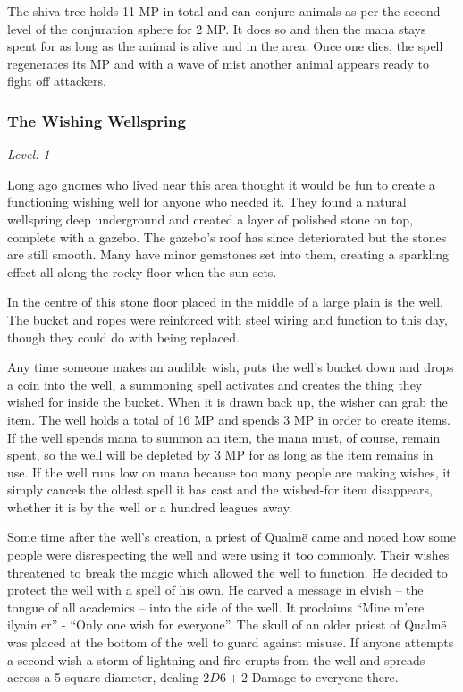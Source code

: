 \begin{multicols}{2}
The shiva tree holds 11 MP in total and can conjure animals as per the second level of the conjuration sphere for 2 MP.  It does so and then the mana stays spent for as long as the animal is alive and in the area.  Once one dies, the spell regenerates its MP and with a wave of mist another animal appears ready to fight off attackers.

\subsubsection{The Wishing Wellspring}

\textit{Level: 1}

Long ago gnomes who lived near this area thought it would be fun to create a functioning wishing well for anyone who needed it.  They found a natural wellspring deep underground and created a layer of polished stone on top, complete with a gazebo.  The gazebo's roof has since deteriorated but the stones are still smooth.  Many have minor gemstones set into them, creating a sparkling effect all along the rocky floor when the sun sets.

In the centre of this stone floor placed in the middle of a large plain is the well.  The bucket and ropes were reinforced with steel wiring and function to this day, though they could do with being replaced.

Any time someone makes an audible wish, puts the well's bucket down and drops a coin into the well, a summoning spell activates and creates the thing they wished for inside the bucket.  When it is drawn back up, the wisher can grab the item.  The well holds a total of 16 MP and spends 3 MP in order to create items.  If the well spends mana to summon an item, the mana must, of course, remain spent, so the well will be depleted by 3 MP for as long as the item remains in use.  If the well runs low on mana because too many people are making wishes, it simply cancels the oldest spell it has cast and the wished-for item disappears, whether it is by the well or a hundred leagues away.

Some time after the well's creation, a priest of Qualm\"{e} came and noted how some people were disrespecting the well and were using it too commonly.  Their wishes threatened to break the magic which allowed the well to function.  He decided to protect the well with a spell of his own.  He carved a message in elvish -- the tongue of all academics -- into the side of the well.  It proclaims ``Mine m'{e}re ilyain er'' - ``Only one wish for everyone''.  The skull of an older priest of Qualm\"{e} was placed at the bottom of the well to guard against misuse.  If anyone attempts a second wish a storm of lightning and fire erupts from the well and spreads across a 5 square diameter, dealing $2D6+2$ Damage to everyone there.


\end{multicols}
